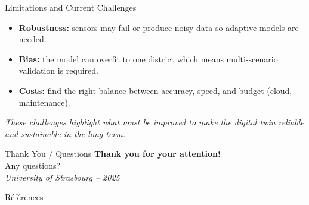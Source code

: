 \documentclass{beamer}
\begin{document}
\begin{frame}{Limitations and Current Challenges}
\small
\begin{itemize}
    \item \textbf{Robustness:} sensors may fail or produce noisy data so adaptive models are needed.  
    \item \textbf{Bias:} the model can overfit to one district which means multi-scenario validation is required. 
    \item \textbf{Costs:} find the right balance between accuracy, speed, and budget (cloud, maintenance).  
\end{itemize}
\vspace{3mm}
\textit{These challenges highlight what must be improved to make the digital twin reliable and sustainable in the long term.}
\end{frame}


\begin{frame}{Thank You / Questions}
\centering
\Huge \textbf{Thank you for your attention!} \\
\vspace{1cm}
\Large Any questions? \\
\vspace{0.5cm}
\textit{University of Strasbourg – 2025}
\end{frame}



\begin{frame}[allowframebreaks]{Références}
  \nocite{*}
  
  
\end{frame}
\end{document}
